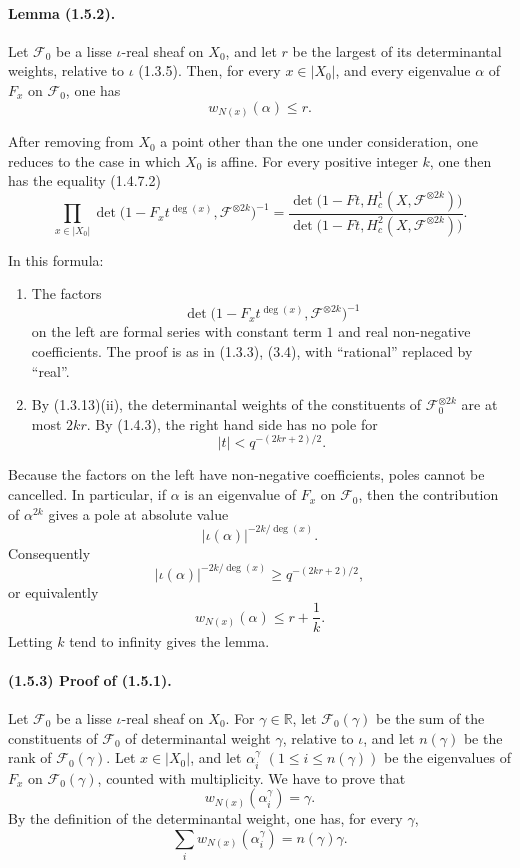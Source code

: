\documentclass[11pt]{article}
\theoremstyle{remark}
\begin{document}
\paragraph{Lemma (1.5.2).} Let $\mathcal F_0$ be a lisse $\iota$-real sheaf on $X_0$, and let $r$ be the largest of its determinantal weights, relative to $\iota$ (1.3.5). Then, for every $x\in |X_0|$, and every eigenvalue $\alpha$ of $F_x$ on $\mathcal F_0$, one has
\[
w_{N(x)}(\alpha)\le r.
\]

After removing from $X_0$ a point other than the one under consideration, one reduces to the case in which $X_0$ is affine. For every positive integer $k$, one then has the equality (1.4.7.2)
\begin{equation}\tag{1.5.2.1}
\prod_{x\in |X_0|}\det\bigl(1-F_x t^{\deg(x)},\mathcal F^{\otimes 2k}\bigr)^{-1}
=
\frac{\det\bigl(1-Ft,H^1_c(X,\mathcal F^{\otimes 2k})\bigr)}
{\det\bigl(1-Ft,H^2_c(X,\mathcal F^{\otimes 2k})\bigr)}.
\end{equation}

In this formula:
\begin{enumerate}[label=\alph*)]
\item The factors
\[
\det\bigl(1-F_x t^{\deg(x)},\mathcal F^{\otimes 2k}\bigr)^{-1}
\]
on the left are formal series with constant term $1$ and real non-negative coefficients. The proof is as in (1.3.3), (3.4), with ``rational'' replaced by ``real''.

\item By (1.3.13)(ii), the determinantal weights of the constituents of $\mathcal F_0^{\otimes 2k}$ are at most $2kr$. By (1.4.3), the right hand side has no pole for
\[
 |t|<q^{-(2kr+2)/2}.
\]
\end{enumerate}

Because the factors on the left have non-negative coefficients, poles cannot be cancelled. In particular, if $\alpha$ is an eigenvalue of $F_x$ on $\mathcal F_0$, then the contribution of $\alpha^{2k}$ gives a pole at absolute value
\[
 |\iota(\alpha)|^{-2k/\deg(x)}.
\]
Consequently
\[
 |\iota(\alpha)|^{-2k/\deg(x)}\ge q^{-(2kr+2)/2},
\]
or equivalently
\[
w_{N(x)}(\alpha)\le r+\frac1k.
\]
Letting $k$ tend to infinity gives the lemma.

\paragraph{(1.5.3) Proof of (1.5.1).} Let $\mathcal F_0$ be a lisse $\iota$-real sheaf on $X_0$. For $\gamma\in\mathbb R$, let $\mathcal F_0(\gamma)$ be the sum of the constituents of $\mathcal F_0$ of determinantal weight $\gamma$, relative to $\iota$, and let $n(\gamma)$ be the rank of $\mathcal F_0(\gamma)$. Let $x\in |X_0|$, and let $\alpha_i^\gamma$ $(1\le i\le n(\gamma))$ be the eigenvalues of $F_x$ on $\mathcal F_0(\gamma)$, counted with multiplicity. We have to prove that
\[
w_{N(x)}(\alpha_i^\gamma)=\gamma.
\]
By the definition of the determinantal weight, one has, for every $\gamma$,
\begin{equation}\tag{1.5.3.1}
\sum_i w_{N(x)}(\alpha_i^\gamma)=n(\gamma)\gamma.
\end{equation}
\end{document}
